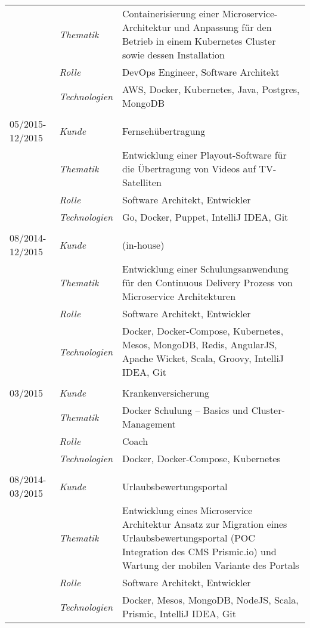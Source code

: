 \begin{longtable}{@{}>{}p{4cm}>{\itshape}p{2cm}>{}p{9cm}}
\nopagebreak		& Thematik	    & Containerisierung einer Microservice-Architektur und Anpassung für den Betrieb in einem Kubernetes Cluster sowie dessen Installation\\
\nopagebreak		& Rolle 	    & DevOps Engineer, Software Architekt\\
\nopagebreak		& Technologien	& AWS, Docker, Kubernetes, Java, Postgres, MongoDB\\
\\
05/2015-12/2015     & Kunde 	    & Fernsehübertragung\\
\nopagebreak		& Thematik	    & Entwicklung einer Playout-Software für die Übertragung von Videos auf TV-Satelliten\\
\nopagebreak		& Rolle 	    & Software Architekt, Entwickler\\
\nopagebreak		& Technologien	& Go, Docker, Puppet, IntelliJ IDEA, Git\\
\\
08/2014-12/2015     & Kunde 	    & (in-house)\\
\nopagebreak		& Thematik	    & Entwicklung einer Schulungsanwendung für den Continuous Delivery Prozess von Microservice Architekturen\\
\nopagebreak		& Rolle 	    & Software Architekt, Entwickler\\
\nopagebreak		& Technologien	& Docker, Docker-Compose, Kubernetes, Mesos, MongoDB, Redis, AngularJS, Apache Wicket, Scala, Groovy, IntelliJ IDEA, Git\\
\\
03/2015             & Kunde 	    & Krankenversicherung\\
\nopagebreak		& Thematik	    & Docker Schulung – Basics und Cluster-Management\\
\nopagebreak		& Rolle 	    & Coach\\
\nopagebreak		& Technologien	& Docker, Docker-Compose, Kubernetes\\
\\
08/2014-03/2015     & Kunde 	    & Urlaubsbewertungsportal\\
\nopagebreak		& Thematik	    & Entwicklung eines Microservice Architektur Ansatz zur Migration eines Urlaubsbewertungsportal (POC Integration des CMS Prismic.io) und Wartung der mobilen Variante des Portals\\
\nopagebreak		& Rolle 	    & Software Architekt, Entwickler\\
\nopagebreak		& Technologien	& Docker, Mesos, MongoDB, NodeJS, Scala, Prismic, IntelliJ IDEA, Git\\

\end{longtable}
